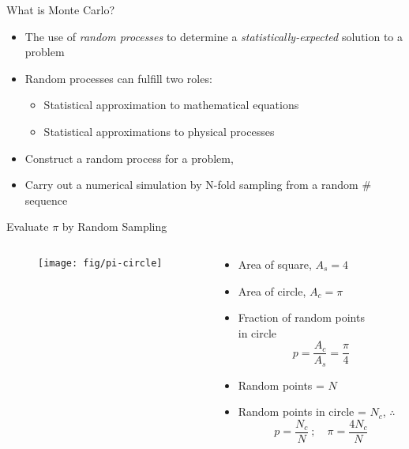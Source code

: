 \documentclass[xcolor=x11names,compress]{beamer}
\renewcommand{\(}{\begin{columns}}
\renewcommand{\)}{\end{columns}}
\newcommand{\<}[1]{\begin{column}{#1}}
\renewcommand{\>}{\end{column}}
\begin{document}
\begin{frame}{What is Monte Carlo?}

  \begin{itemize}
  \item The use of \textit{random processes} to determine a 
        \textit{statistically-expected} solution to a problem
  \vspace*{1em}
  \item Random processes can fulfill two roles:
  \begin{itemize}
    \item Statistical approximation to \alert{mathematical equations}
    \item Statistical approximations to \alert{physical processes}
  \end{itemize}   
 \vspace*{1em} 
  \item Construct a random process for a problem, 
  \item Carry out a numerical simulation by N-fold sampling from a random \# sequence
\end{itemize}
\end{frame}

\begin{frame}{Evaluate $\pi$ by Random Sampling}

\begin{columns}
  \begin{column}{0.45\textwidth}
  	\begin{figure}
  	\begin{center}
  		\texttt{[image: fig/pi-circle]}
	\end{center}
  	\end{figure}
  \end{column}
  \begin{column}{0.55\textwidth}
    \begin{itemize}
    \item Area of square, $A_s= 4$
    \item Area of circle, $A_c = \pi$
    \item Fraction of random points \\in circle
    \[p = \frac{A_c}{A_s} = \frac{\pi}{4}\]
    \item Random points = $N$
    \item Random points in circle  = $N_c$, $\therefore$
    \[p = \frac{N_c}{N}\:; \quad \pi = \frac{4N_c}{N}\]
    \end{itemize}
  \end{column}
\end{columns}
\end{frame}
\end{document}
